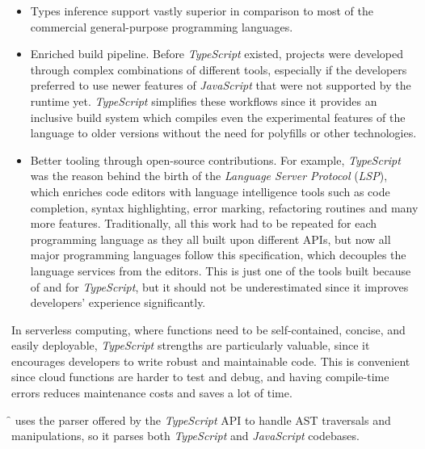 \begin{itemize}
  \item Types inference support vastly superior in comparison to most of the commercial
    general-purpose programming languages.%
  \item Enriched build pipeline. Before \textit{TypeScript} existed, projects
    were developed through complex combinations of different tools, especially if the
    developers preferred to use newer features of \textit{JavaScript} that were not
    supported by the runtime yet. \textit{TypeScript} simplifies these workflows since it provides
    an inclusive build system which compiles even the experimental features of the language
    to older versions without the need for polyfills or other technologies.
  \item Better tooling through open-source contributions.
    For example, \textit{TypeScript} was the reason behind the birth of the \textit{Language Server Protocol} (\textit{LSP}),
    which enriches code editors with language intelligence tools such as code completion, syntax highlighting,
    error marking, refactoring routines and many more features. Traditionally, all this work
    had to be repeated for each programming language as they all built upon different APIs,
    but now all major programming languages follow this specification, which decouples
    the language services from the editors.
    This is just one of the tools built because of and for \textit{TypeScript},
    but it should not be underestimated since it improves developers' experience significantly.
\end{itemize}

In serverless computing, where functions need to be self-contained, concise, and easily deployable,
\textit{TypeScript} strengths are particularly valuable, since
it encourages developers to write robust and maintainable code.
This is convenient since cloud functions are harder to test and debug,
and having compile-time errors reduces maintenance costs and saves a lot of time.

\f{} uses the parser offered by the \textit{TypeScript} API
to handle AST traversals and manipulations,
so it parses both \textit{TypeScript} and \textit{JavaScript} codebases.
